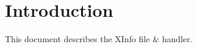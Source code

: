 \documentclass[a4paper, 11pt]{article}
\begin{document}
\section{Introduction}

This document describes the XInfo file \& handler.
\end{document}
